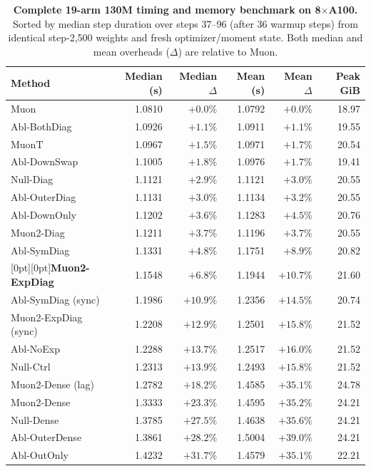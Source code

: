 \begin{table}[tbp]\centering\footnotesize
\setlength{\tabcolsep}{9.5pt}
\caption{\textbf{Complete 19-arm 130M timing and memory benchmark on 8$\times$A100.} Sorted by median step duration over steps 37--96 (after 36 warmup steps) from identical step-2,500 weights and fresh optimizer/moment state. Both median and mean overheads ($\Delta$) are relative to Muon.}\label{tab:bench19}
\begin{tabularx}{\textwidth}{@{}>{\raggedright\arraybackslash}Xrrrrr@{}}
\toprule
Method & Median (s) & Median $\Delta$ & Mean (s) & Mean $\Delta$ & Peak GiB \\
\midrule
Muon & 1.0810 & $+0.0\%$ & 1.0792 & $+0.0\%$ & 18.97 \\
Abl-BothDiag & 1.0926 & $+1.1\%$ & 1.0911 & $+1.1\%$ & 19.55 \\
MuonT & 1.0967 & $+1.5\%$ & 1.0971 & $+1.7\%$ & 20.54 \\
Abl-DownSwap & 1.1005 & $+1.8\%$ & 1.0976 & $+1.7\%$ & 19.41 \\
Null-Diag & 1.1121 & $+2.9\%$ & 1.1121 & $+3.0\%$ & 20.55 \\
Abl-OuterDiag & 1.1131 & $+3.0\%$ & 1.1134 & $+3.2\%$ & 20.55 \\
Abl-DownOnly & 1.1202 & $+3.6\%$ & 1.1283 & $+4.5\%$ & 20.76 \\
Muon2-Diag & 1.1211 & $+3.7\%$ & 1.1196 & $+3.7\%$ & 20.55 \\
Abl-SymDiag & 1.1331 & $+4.8\%$ & 1.1751 & $+8.9\%$ & 20.82 \\
\rowcolor{rowtint}[0pt][0pt]\textbf{Muon2-ExpDiag} & 1.1548 & $+6.8\%$ & 1.1944 & $+10.7\%$ & 21.60 \\
Abl-SymDiag (sync) & 1.1986 & $+10.9\%$ & 1.2356 & $+14.5\%$ & 20.74 \\
Muon2-ExpDiag (sync) & 1.2208 & $+12.9\%$ & 1.2501 & $+15.8\%$ & 21.52 \\
Abl-NoExp & 1.2288 & $+13.7\%$ & 1.2517 & $+16.0\%$ & 21.52 \\
Null-Ctrl & 1.2313 & $+13.9\%$ & 1.2493 & $+15.8\%$ & 21.52 \\
Muon2-Dense (lag) & 1.2782 & $+18.2\%$ & 1.4585 & $+35.1\%$ & 24.78 \\
Muon2-Dense & 1.3333 & $+23.3\%$ & 1.4595 & $+35.2\%$ & 24.21 \\
Null-Dense & 1.3785 & $+27.5\%$ & 1.4638 & $+35.6\%$ & 24.21 \\
Abl-OuterDense & 1.3861 & $+28.2\%$ & 1.5004 & $+39.0\%$ & 24.21 \\
Abl-OutOnly & 1.4232 & $+31.7\%$ & 1.4579 & $+35.1\%$ & 22.21 \\
\bottomrule\end{tabularx}
\end{table}
